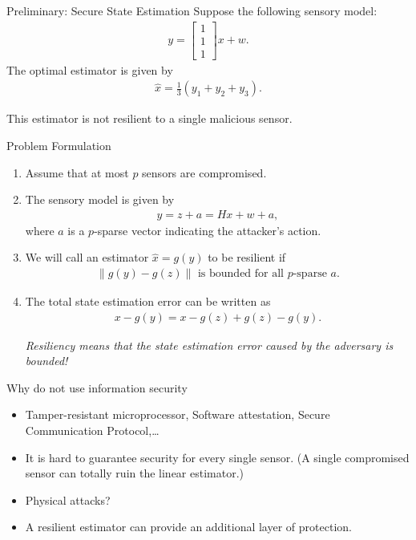 \documentclass[10pt]{beamer}
\begin{document}
\begin{frame}{Preliminary: Secure State Estimation}
  Suppose the following sensory model:
  \begin{align*}
    y = \begin{bmatrix}
      1\\
      1\\
      1
    \end{bmatrix}x + w.
  \end{align*}
  The optimal estimator is given by
  \begin{align*}
    \hat x = \frac{1}{3}\left(y_1+y_2+y_3\right).
  \end{align*}
  
  This estimator is not resilient to a single malicious sensor.
\end{frame}

\begin{frame}{Problem Formulation}
  \begin{enumerate}
  \item Assume that at most $p$ sensors are compromised.
  \item The sensory model is given by
    \begin{align*}
      y = z + a = Hx + w +a,
    \end{align*}
    where $a$ is a $p$-sparse vector indicating the attacker's action.
  \item We will call an estimator $\hat x = g(y)$ to be resilient if
    \begin{align*}
      \|g(y) - g(z)\|\text{ is bounded for all $p$-sparse $a$}.
    \end{align*}
  \item The total state estimation error can be written as
    \begin{align*}
      x-g(y) = x-g(z) + g(z)-g(y).
    \end{align*}

    \emph{Resiliency means that the state estimation error caused by the adversary is bounded!}
  \end{enumerate}
\end{frame}

\begin{frame}{Why do not use information security}
  \begin{itemize}
  \item Tamper-resistant microprocessor, Software attestation, Secure Communication Protocol,\dots
  \item It is hard to guarantee security for every single sensor. (A single compromised sensor can totally ruin the linear estimator.)
  \item Physical attacks?
  \item A resilient estimator can provide an additional layer of protection.
  \end{itemize}
\end{frame}
\end{document}
